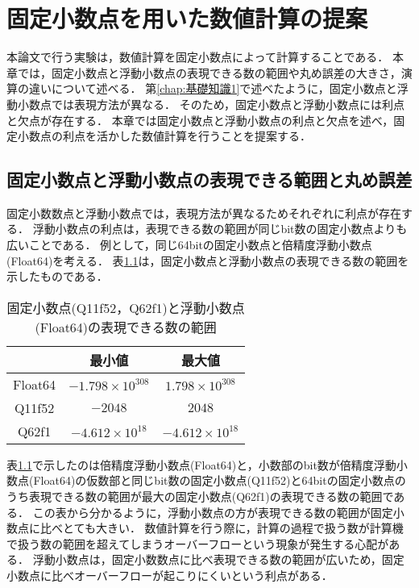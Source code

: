 \chapter {固定小数点を用いた数値計算の提案}
\label{chap:提案手法}
\begin{comment}
    ストーリー：
    固定小数点演算は浮動小数点演算よりも計算時間が速いとされている．
    しかし，浮動小数点に比べて精度が低くなる恐れがある．
    本論文では，固定小数点と浮動小数点での数値計算の結果を比べ，固定小数点での演算も浮動小数点と同程度の精度で計算できることを示した．
    実験結果より固定小数点演算で浮動小数点より高速で，浮動小数点と同程度の計算を実現できるのではないかと考える．
\end{comment}
本論文で行う実験は，数値計算を固定小数点によって計算することである．
本章では，固定小数点と浮動小数点の表現できる数の範囲や丸め誤差の大きさ，演算の違いについて述べる．
第\ref{chap:基礎知識1}で述べたように，固定小数点と浮動小数点では表現方法が異なる．
そのため，固定小数点と浮動小数点には利点と欠点が存在する．
本章では固定小数点と浮動小数点の利点と欠点を述べ，固定小数点の利点を活かした数値計算を行うことを提案する．

\section{固定小数点と浮動小数点の表現できる範囲と丸め誤差}
固定小数数点と浮動小数点では，表現方法が異なるためそれぞれに利点が存在する．
浮動小数点の利点は，表現できる数の範囲が同じbit数の固定小数点よりも広いことである．
例として，同じ64bitの固定小数点と倍精度浮動小数点(Float64)を考える．
表\ref{tab:fixed_float_range}は，固定小数点と浮動小数点の表現できる数の範囲を示したものである．

\begin{table}[H]
    \centering
    \caption{固定小数点(Q11f52，Q62f1)と浮動小数点(Float64)の表現できる数の範囲}
    \begin{tabular}{c|c|c}
         & 最小値 & 最大値　\\ \hline\hline
          Float64 & $-1.798 \times 10^{308}$ & $1.798 \times 10^{308}$ \\
          Q11f52 & $-2048$ & $2048$ \\
          Q62f1 & $-4.612 \times 10^{18}$ & $-4.612 \times 10^{18}$
    \end{tabular}
    \label{tab:fixed_float_range}
\end{table}

表\ref{tab:fixed_float_range}で示したのは倍精度浮動小数点(Float64)と，小数部のbit数が倍精度浮動小数点(Float64)の仮数部と同じbit数の固定小数点(Q11f52)と64bitの固定小数点のうち表現できる数の範囲が最大の固定小数点(Q62f1)の表現できる数の範囲である．
この表から分かるように，浮動小数点の方が表現できる数の範囲が固定小数点に比べとても大きい．
数値計算を行う際に，計算の過程で扱う数が計算機で扱う数の範囲を超えてしまうオーバーフローという現象が発生する心配がある．
浮動小数点は，固定小数数点に比べ表現できる数の範囲が広いため，固定小数点に比べオーバーフローが起こりにくいという利点がある．

